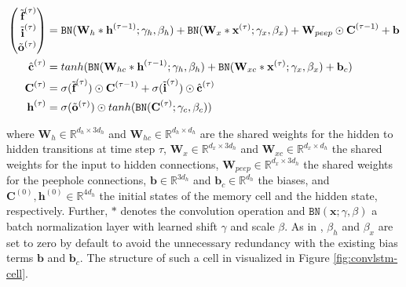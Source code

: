 \begin{equation} \label{eq:convlstm}
\begin{aligned}
\Spvek{\tilde{\textbf{f}}^{(\tau)}; \tilde{\textbf{i}}^{(\tau)}; \tilde{\textbf{o}}^{(\tau)}} &= \texttt{BN}(\textbf{W}_{h} \ast \textbf{h}^{(\tau-1)}; \gamma_h, \beta_h) + \texttt{BN}(\textbf{W}_{x} \ast \textbf{x}^{(\tau)}; \gamma_x, \beta_x) + \textbf{W}_{peep} \odot \textbf{C}^{(\tau-1)} + \textbf{b} \\
\hat{\textbf{c}}^{(\tau)} &= tanh(\texttt{BN}(\textbf{W}_{hc} \ast \textbf{h}^{(\tau-1)}; \gamma_h, \beta_h) + \texttt{BN}(\textbf{W}_{xc} \ast \textbf{x}^{(\tau)}; \gamma_x, \beta_x) + \textbf{b}_c) \\
\textbf{C}^{(\tau)} &= \sigma(\tilde{\textbf{f}}^{(\tau)}) \odot \textbf{C}^{(\tau-1)} + \sigma(\tilde{\textbf{i}}^{(\tau)}) \odot \hat{\textbf{c}}^{(\tau)} \\
\textbf{h}^{(\tau)} &= \sigma(\tilde{\textbf{o}}^{(\tau)}) \odot tanh(\texttt{BN}(\textbf{C}^{(\tau)}; \gamma_c, \beta_c))
\end{aligned}
\end{equation}

where $ \textbf{W}_h \in \mathbb{R}^{d_h \times 3d_h} $ and $ \textbf{W}_{hc} \in \mathbb{R}^{d_h \times d_h} $ are the shared weights for the hidden to hidden transitions at time step $ \tau $, $ \textbf{W}_x \in \mathbb{R}^{d_x \times 3d_h} $ and $ \textbf{W}_{xc} \in \mathbb{R}^{d_x \times d_h} $ the shared weights for the input to hidden connections, $ \textbf{W}_{peep} \in \mathbb{R}^{d_x \times 3d_h} $ the shared weights for the peephole connections, $ \textbf{b} \in \mathbb{R}^{3d_h} $ and $ \textbf{b}_c \in \mathbb{R}^{d_h} $ the biases, and $ \textbf{C}^{(0)}, \textbf{h}^{(0)} \in \mathbb{R}^{4d_h} $ the initial states of the memory cell and the hidden state, respectively. Further, $\ast$ denotes the convolution operation and $ \texttt{BN}(\textbf{x}; \gamma, \beta) $ a batch normalization layer with learned shift $\gamma$ and scale $\beta$. As in \parencite{rnn-batchnorm}, $\beta_h$ and $\beta_x$ are set to zero by default to avoid the unnecessary redundancy with the existing bias terms $\textbf{b}$ and $\textbf{b}_c$. The structure of such a cell in visualized in Figure \ref{fig:convlstm-cell}.

